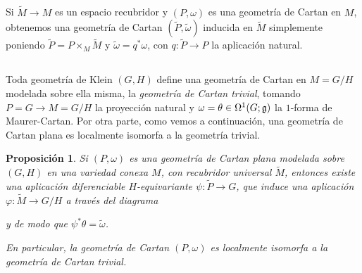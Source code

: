 \documentclass[11pt,a4paper]{amsbook}
\newtheorem{prop}[subsection]{Proposición}
\theoremstyle{remark} \newtheorem{rmk}[subsection]{Observación}
\theoremstyle{definition} \newtheorem{defn}[subsection]{Definición}
\theoremstyle{definition} \newtheorem{ex}[subsection]{Ejemplo}
\theoremstyle{definition} \newtheorem{ej}[subsection]{Ejercicio}
\begin{document}
\subsection{} Si $\widetilde{M}\rightarrow M$ es un espacio recubridor y $(P,\omega)$ es una geometría de Cartan en $M$, obtenemos una geometría de Cartan $(\widetilde{P},\widetilde{\omega})$ inducida en $\widetilde{M}$ simplemente poniendo $\widetilde{P}=P \times_M \widetilde{M}$ y $\widetilde{\omega}= q^* \omega$, con $q:\widetilde{P}\rightarrow P$ la aplicación natural.

\subsection{} Toda geometría de Klein $(G,H)$ define una geometría de Cartan en $M=G/H$ modelada sobre ella misma, la \emph{geometría de Cartan trivial}, tomando $P=G\rightarrow M=G/H$ la proyección natural y $\omega=\theta \in \Omega^1(G;\mathfrak{g})$ la $1$-forma de Maurer-Cartan. Por otra parte, como vemos a continuación, una geometría de Cartan plana es localmente isomorfa a la geometría trivial.

\begin{prop}
  Si $(P,\omega)$ es una geometría de Cartan plana modelada sobre $(G,H)$ en una variedad conexa $M$, con recubridor universal $\widetilde{M}$, entonces existe una aplicación diferenciable $H$-equivariante $\psi:\widetilde{P}\rightarrow G$, que induce una aplicación $\varphi:\widetilde{M}\rightarrow G/H$ a través del diagrama
\begin{center}
\end{center}
y de modo que $\psi^* \theta = \tilde{\omega}$.

En particular, la geometría de Cartan $(P,\omega)$ es localmente isomorfa a la geometría de Cartan trivial.
\end{prop}
\end{document}
